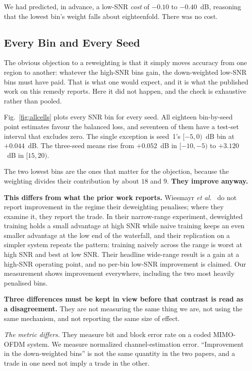 \documentclass[journal]{IEEEtran}
\begin{document}
We had predicted, in advance, a low-SNR \emph{cost} of $-0.10$ to $-0.40$~dB,
reasoning that the lowest bin's weight falls about eighteenfold. There was no
cost.

\subsection{Every Bin and Every Seed}

The obvious objection to a reweighting is that it simply moves accuracy from
one region to another: whatever the high-SNR bins gain, the down-weighted
low-SNR bins must have paid. That is what one would expect, and it is what the
published work on this remedy reports. Here it did not happen, and the check is
exhaustive rather than pooled.

Fig.~\ref{fig:allcells} plots every SNR bin for every seed. All eighteen
bin-by-seed point estimates favour the balanced loss, and seventeen of them
have a test-set interval that excludes zero. The single exception is seed~1's
$[-5,0)$~dB bin at $+0.044$~dB. The three-seed means rise from $+0.052$~dB in
$[-10,-5)$ to $+3.120$~dB in $[15,20)$.

The two lowest bins are the ones that matter for the objection, because the
weighting divides their contribution by about $18$ and $9$. \textbf{They
improve anyway.}

\textbf{This differs from what the prior work reports.} Wiesmayr \emph{et
al.}~\cite{wiesmayr2023bler} do not report improvement in the regime their
deweighting penalises; where they examine it, they report the trade. In their
narrow-range experiment, deweighted training holds a small advantage at high
SNR while naive training keeps an even smaller advantage at the low end of the
waterfall, and their replication on a simpler system repeats the pattern:
training naively across the range is worst at high SNR and best at low SNR.
Their headline wide-range result is a gain at a high-SNR operating point, and
no per-bin low-SNR improvement is claimed. Our measurement shows improvement
everywhere, including the two most heavily penalised bins.

\textbf{Three differences must be kept in view before that contrast is read as
a disagreement.} They are not measuring the same thing we are, not using the
same mechanism, and not reporting the same size of effect.

\emph{The metric differs.} They measure bit and block error rate on a coded
MIMO-OFDM system. We measure normalized channel-estimation error. ``Improvement
in the down-weighted bins'' is not the same quantity in the two papers, and a
trade in one need not imply a trade in the other.
\end{document}

